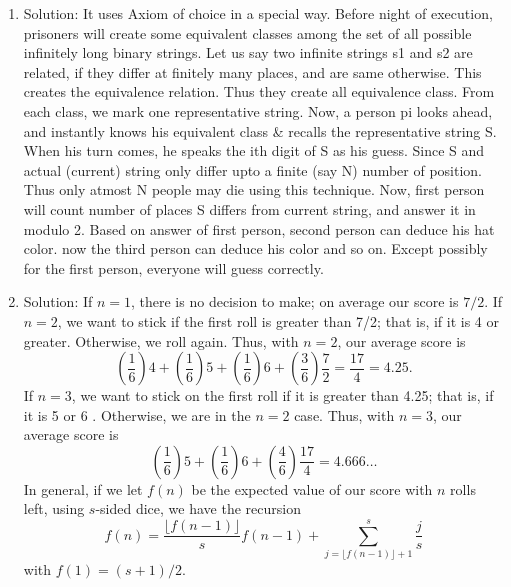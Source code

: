 \begin{enumerate}

\item
Solution: It uses Axiom of choice in a special way. Before night of execution, prisoners will create some equivalent classes among the set of all possible infinitely long binary strings. Let us say two infinite strings s1 and s2 are related, if they differ at finitely many places, and are same otherwise. This creates the equivalence relation. Thus they create all equivalence class. From each class, we mark one representative string.
Now, a person pi looks ahead, and instantly knows his equivalent class \& recalls the representative string S. When his turn comes, he speaks the ith digit of S as his guess. Since S and actual (current) string only differ upto a finite (say N) number of position. Thus only atmost N people may die using this technique.
Now, first person will count number of places S differs from current string, and answer it in modulo 2. Based on answer of first person, second person can deduce his hat color. now the third person can deduce his color and so on. Except possibly for the first person, everyone will guess correctly.


\item
Solution: If $n=1$, there is no decision to make; on average our score is $7 / 2$.
If $n=2$, we want to stick if the first roll is greater than 7/2; that is, if it is 4 or greater. Otherwise, we roll again. Thus, with $n=2$, our average score is
$$
\left(\frac{1}{6}\right) 4+\left(\frac{1}{6}\right) 5+\left(\frac{1}{6}\right) 6+\left(\frac{3}{6}\right) \frac{7}{2}=\frac{17}{4}=4.25 .
$$
If $n=3$, we want to stick on the first roll if it is greater than 4.25; that is, if it is 5 or 6 . Otherwise, we are in the $n=2$ case. Thus, with $n=3$, our average score is
$$
\left(\frac{1}{6}\right) 5+\left(\frac{1}{6}\right) 6+\left(\frac{4}{6}\right) \frac{17}{4}=4.666 \ldots
$$
In general, if we let $f(n)$ be the expected value of our score with $n$ rolls left, using $s$-sided dice, we have the recursion
$$
f(n)=\frac{\lfloor f(n-1)\rfloor}{s} f(n-1)+\sum_{j=\lfloor f(n-1)\rfloor+1}^s \frac{j}{s}
$$
with $f(1)=(s+1) / 2$.





\end{enumerate}
